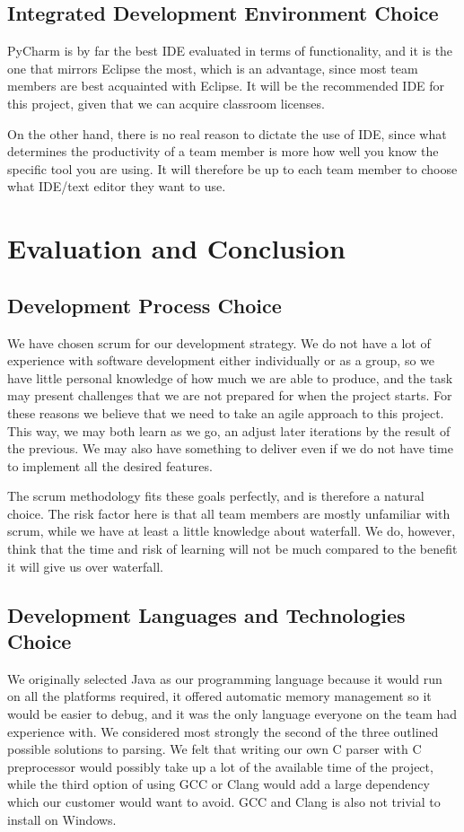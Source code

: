 \begin{description}
\subsection{Integrated Development Environment Choice}
PyCharm is by far the best IDE evaluated in terms of functionality, and it is
the one that mirrors Eclipse the most, which is an advantage, since most team
members are best acquainted with Eclipse. It will be the recommended IDE for
this project, given that we can acquire classroom licenses.

On the other hand, there is no real reason to dictate the use of IDE, since
what determines the productivity of a team member is more how well you know
the specific tool you are using. It will therefore be up to each team member
to choose what IDE/text editor they want to use.

\section{Evaluation and Conclusion}

\subsection{Development Process Choice}
We have chosen scrum for our development strategy. We do not have a lot of
experience with software development either individually or as a group, so we
have little personal knowledge of how much we are able to produce, and the
task may present challenges that we are not prepared for when the project
starts. For these reasons we believe that we need to take an agile approach to
this project. This way, we may both learn as we go, an adjust later iterations
by the result of the previous. We may also have something to deliver even if we
do not have time to implement all the desired features.

The scrum methodology fits these goals perfectly, and is therefore a natural
choice. The risk factor here is that all team members are mostly unfamiliar
with scrum, while we have at least a little knowledge about waterfall. We do,
however, think that the time and risk of learning will not be much compared to
the benefit it will give us over waterfall.

\subsection{Development Languages and Technologies Choice}
We originally selected Java as our programming language because it would run on
all the platforms required, it offered automatic memory management so it would
be easier to debug, and it was the only language everyone on the team had
experience with. We considered most strongly the second of the three outlined
possible solutions to parsing. We felt that writing our own C parser with C
preprocessor would possibly take up a lot of the available time of the project,
while the third option of using GCC or Clang would add a large dependency which
our customer would want to avoid. GCC and Clang is also not trivial to install
on Windows.


\end{description}
